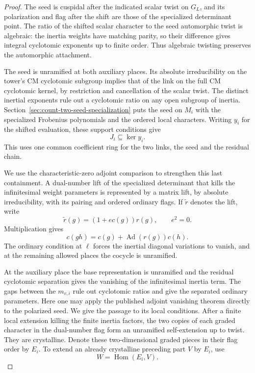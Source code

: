 \begin{proof}
The seed is cuspidal after the indicated scalar twist
on \(G_L\), and its polarization and flag after the
shift are those of the specialized determinant point.
The ratio of the shifted scalar character to the seed
automorphic twist is algebraic: the inertia weights have
matching parity, so their difference gives integral
cyclotomic exponents up to finite order. Thus algebraic
twisting preserves the automorphic attachment.

The seed
is unramified at both auxiliary places. Its absolute
irreducibility on the tower's CM cyclotomic subgroup
implies that of the link on the full CM cyclotomic kernel,
by restriction and cancellation of the scalar twist.
The distinct inertial exponents rule out a cyclotomic
ratio on any open subgroup of inertia.
Section~\ref{sec:count-two-seed-specialization} puts the seed
on \(M_i\) with the specialized Frobenius polynomials and
the ordered local characters. Writing \(y_i\) for the shifted evaluation, these support conditions give
\[
 J_i\subseteq\ker y_i.
\]
This uses one common
coefficient ring for the two links, the seed and the
residual chain.

We use the characteristic-zero adjoint comparison to
strengthen this last containment. A dual-number
lift of the specialized determinant that kills the
infinitesimal weight parameters is represented by a
matrix lift, by absolute irreducibility, with its pairing
and ordered ordinary flags. If \(\widetilde r\) denotes the lift, write
\[
 \widetilde r(g)=(1+e c(g))r(g),\qquad e^2=0.
\]
Multiplication gives
\[
 c(gh)=c(g)+\operatorname{Ad}(r(g))c(h).
\]
The ordinary condition at \(\ell\) forces the inertial diagonal variations to vanish, and at the remaining allowed places the cocycle is unramified.

At the
auxiliary place the base representation is unramified
and the residual cyclotomic separation gives the
vanishing of the infinitesimal inertia term. The
gaps between the \(m_{v,i}\) rule out cyclotomic
ratios and give the separated ordinary parameters.
Here one may apply the published adjoint vanishing theorem
directly to the polarized seed. We give the passage to its
local conditions. After a finite local extension killing
the finite inertia factors, the two copies of each graded
character in the dual-number flag form an unramified
self-extension up to twist. They are crystalline. Denote
these two-dimensional graded pieces in their flag order
by \(E_i\). To extend an already crystalline preceding
part \(V\) by \(E_i\), use
\[
 W=\operatorname{Hom}(E_i,V).
\]


\end{proof}
